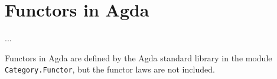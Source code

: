 




\section{Functors in Agda}
\label{sec:functors-agda}

...

Functors in Agda are defined by the Agda standard library
\parencite{danielsson-2013} in the module \texttt{Category.Functor},
but the functor laws are not included.

